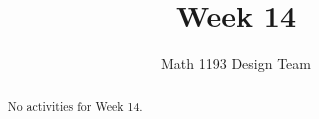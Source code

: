 \documentclass[noauthor]{ximera}
\title{Week 14}
\author{Math 1193 Design Team}
\begin{document}
\begin{abstract}
    No activities for Week 14.
\end{abstract}
\maketitle





\end{document}
